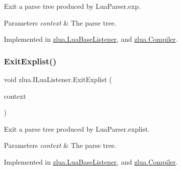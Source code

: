 Exit a parse tree produced by Lua\+Parser.\+exp. 


\begin{DoxyParams}{Parameters}
{\em context} & The parse tree.\\
\hline
\end{DoxyParams}


Implemented in \mbox{\hyperlink{classzlua_1_1_lua_base_listener_aa397d17db00c6af6db3c06a7a35da3c8}{zlua.\+Lua\+Base\+Listener}}, and \mbox{\hyperlink{classzlua_1_1_compiler_afab9279bd386382fb1fa91044f5b8e71}{zlua.\+Compiler}}.

\mbox{\label{interfacezlua_1_1_i_lua_listener_ad4f41520ee19a409350ab83e01086217}} 
\subsubsection{\texorpdfstring{Exit\+Explist()}{ExitExplist()}}
{\footnotesize\ttfamily void zlua.\+I\+Lua\+Listener.\+Exit\+Explist (\begin{DoxyParamCaption}\item[{\mbox{[}\+Not\+Null\mbox{]} \mbox{\hyperlink{classzlua_1_1_lua_parser_1_1_explist_context}{Lua\+Parser.\+Explist\+Context}}}]{context }\end{DoxyParamCaption})}



Exit a parse tree produced by Lua\+Parser.\+explist. 


\begin{DoxyParams}{Parameters}
{\em context} & The parse tree.\\
\hline
\end{DoxyParams}


Implemented in \mbox{\hyperlink{classzlua_1_1_lua_base_listener_a35af8fb9b7bc09c657281846943392a8}{zlua.\+Lua\+Base\+Listener}}, and \mbox{\hyperlink{classzlua_1_1_compiler_a54d71e09af5891553fa884334ce40a14}{zlua.\+Compiler}}.

\mbox{\label{interfacezlua_1_1_i_lua_listener_a78a5b4e244b54f1233447bc8da8f1ac2}} 
